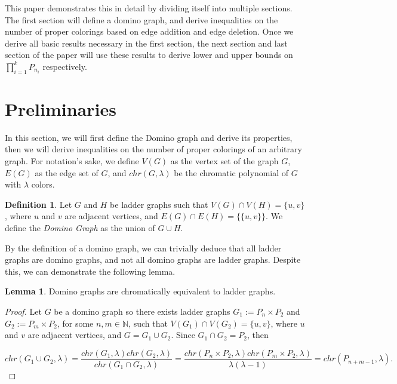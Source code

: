 \documentclass[11pt]{article}
\theoremstyle{definition}
\newcommand{\N}{{\mathbb{N}}}
\newtheorem{lem}{Lemma}
\newtheorem{defn}{Definition}
\begin{document}
This paper demonstrates this in detail by dividing itself into multiple sections. The first section will define a domino graph, and derive inequalities on the number of proper colorings based on edge addition and edge deletion. Once we derive all basic results necessary in the first section, the next section and last section of the paper will use these results to derive lower and upper bounds on $\prod_{i = 1}^{k} P_{n_{i}}$ respectively.


\section{Preliminaries}
\label{sec:Preliminaries}

In this section, we will first define the Domino graph and derive its properties, then we will derive inequalities on the number of proper colorings of an arbitrary graph. For notation's sake, we define $V(G)$ as the vertex set of the graph $G$, $E(G)$ as the edge set of $G$, and $chr(G,\lambda)$ be the chromatic polynomial of $G$ with $\lambda$ colors.

\begin{defn}
Let $G$ and $H$ be ladder graphs such that $V(G) \cap V(H) = \{u,v\}$, where $u$ and $v$ are adjacent vertices, and $E(G) \cap E(H) = \{\{u, v\}\}$. We define the \textit{Domino Graph} as the union of $G \cup H$.
\end{defn}

By the definition of a domino graph, we can trivially deduce that all ladder graphs are domino graphs, and not all domino graphs are ladder graphs. Despite this, we can demonstrate the following lemma.

\begin{lem}
Domino graphs are chromatically equivalent to ladder graphs.
\end{lem}

\begin{proof}
Let $G$ be a domino graph so there exists ladder graphs $G_1 := P_n \times P_2$ and $G_2 := P_m \times P_2$, for some $n, m \in \N$, such that $V(G_1) \cap V(G_2) = \{u, v\}$, where $u$ and $v$ are adjacent vertices, and $G = G_1 \cup G_2$. Since $G_1 \cap G_2 = P_2$, then

\begin{equation}
chr(G_1 \cup G_2, \lambda) = \frac{chr(G_1,\lambda)chr(G_2,\lambda)}{chr(G_1 \cap G_2, \lambda)} = \frac{chr(P_n \times P_2,\lambda)chr(P_m \times P_2,\lambda)}{\lambda(\lambda - 1)} = chr(P_{n + m - 1},\lambda). \nonumber
\end{equation}

\end{proof}
\end{document}
